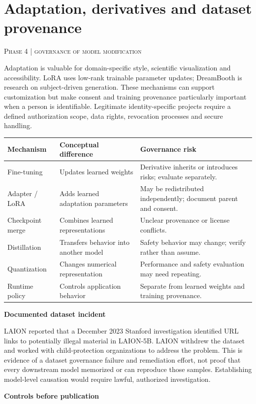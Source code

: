 \documentclass[11pt,a4paper]{article}
\newcommand{\sect}[2]{\section{#1}\textcolor{muted}{\small\textsc{#2}}\par\vspace{2mm}}
\newcommand{\sub}[1]{\vspace{1mm}\textbf{#1}\par}
\begin{document}
\clearpage\sect{Adaptation, derivatives and dataset provenance}{Phase 4 | governance of model modification}

Adaptation is valuable for domain-specific style, scientific visualization and accessibility. LoRA uses low-rank trainable parameter updates; DreamBooth is research on subject-driven generation. These mechanisms can support customization but make consent and training provenance particularly important when a person is identifiable. Legitimate identity-specific projects require a defined authorization scope, data rights, revocation processes and secure handling. \cite{lora,loradiff,dream}


\begin{center}\small\begin{tabularx}{\linewidth}{@{}YYY@{}}\toprule
\textbf{Mechanism} & \textbf{Conceptual difference} & \textbf{Governance risk}\\\midrule
Fine-tuning & Updates learned weights & Derivative inherits or introduces risks; evaluate separately.\\
Adapter / LoRA & Adds learned adaptation parameters & May be redistributed independently; document parent and consent.\\
Checkpoint merge & Combines learned representations & Unclear provenance or license conflicts.\\
Distillation & Transfers behavior into another model & Safety behavior may change; verify rather than assume.\\
Quantization & Changes numerical representation & Performance and safety evaluation may need repeating.\\
Runtime policy & Controls application behavior & Separate from learned weights and training provenance.\\\bottomrule\end{tabularx}\end{center}

\sub{Documented dataset incident}

LAION reported that a December 2023 Stanford investigation identified URL links to potentially illegal material in LAION-5B. LAION withdrew the dataset and worked with child-protection organizations to address the problem. This is evidence of a dataset governance failure and remediation effort, not proof that every downstream model memorized or can reproduce those samples. Establishing model-level causation would require lawful, authorized investigation. \cite{laion}


\sub{Controls before publication}
\end{document}
